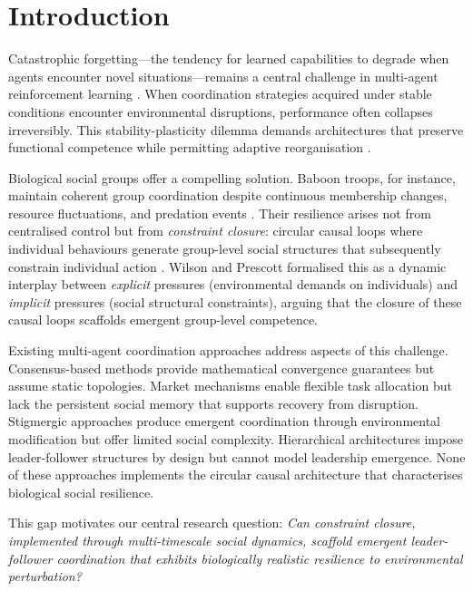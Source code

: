\documentclass[12pt]{article}
\begin{document}
\section{Introduction}
\label{sec:intro}

Catastrophic forgetting---the tendency for learned capabilities to degrade when agents encounter novel situations---remains a central challenge in multi-agent reinforcement learning \cite{mccloskey1989,kirkpatrick2017}. When coordination strategies acquired under stable conditions encounter environmental disruptions, performance often collapses irreversibly. This stability-plasticity dilemma demands architectures that preserve functional competence while permitting adaptive reorganisation \cite{parisi2019}.

Biological social groups offer a compelling solution. Baboon troops, for instance, maintain coherent group coordination despite continuous membership changes, resource fluctuations, and predation events \cite{king2009,seyfarth2012}. Their resilience arises not from centralised control but from \emph{constraint closure}: circular causal loops where individual behaviours generate group-level social structures that subsequently constrain individual action \cite{wilson2022}. Wilson and Prescott \cite{wilson2022} formalised this as a dynamic interplay between \emph{explicit} pressures (environmental demands on individuals) and \emph{implicit} pressures (social structural constraints), arguing that the closure of these causal loops scaffolds emergent group-level competence.

Existing multi-agent coordination approaches address aspects of this challenge. Consensus-based methods \cite{olfati2004,ren2005} provide mathematical convergence guarantees but assume static topologies. Market mechanisms \cite{dias2006} enable flexible task allocation but lack the persistent social memory that supports recovery from disruption. Stigmergic approaches \cite{dorigo2000,theraulaz1999} produce emergent coordination through environmental modification but offer limited social complexity. Hierarchical architectures \cite{werger2000,chen2020} impose leader-follower structures by design but cannot model leadership emergence. None of these approaches implements the circular causal architecture that characterises biological social resilience.

This gap motivates our central research question: \emph{Can constraint closure, implemented through multi-timescale social dynamics, scaffold emergent leader-follower coordination that exhibits biologically realistic resilience to environmental perturbation?}
\end{document}
